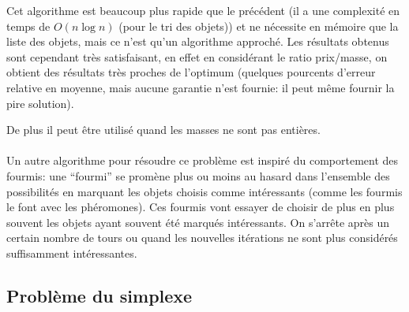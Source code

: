     Cet algorithme est beaucoup plus rapide que le précédent (il a une
    complexité en temps de $O(n \log n)$ (pour le tri des objets)) et ne
    nécessite en mémoire que la liste des objets, mais ce n'est qu'un algorithme
    approché. Les résultats obtenus sont cependant très satisfaisant, en effet
    en considérant le ratio \nobreak prix/masse, on obtient des résultats très
    proches de l'optimum (quelques pourcents d'erreur relative en moyenne, mais
    aucune garantie n'est fournie: il peut même fournir la pire solution).

    De plus il peut être utilisé quand les masses ne sont pas entières.

    \paragraph{}
    Un autre algorithme pour résoudre ce problème est inspiré du comportement
    des fourmis: une ``fourmi'' se promène plus ou moins au hasard dans
    l'ensemble des possibilités en marquant les objets choisis comme
    intéressants (comme les fourmis le font avec les phéromones). Ces fourmis
    vont essayer de choisir de plus en plus souvent les objets ayant souvent
    été marqués intéressants. On s'arrête après un certain nombre de tours ou
    quand les nouvelles itérations ne sont plus considérés suffisamment
    intéressantes.

\subsection{Problème du simplexe}
  \todo
